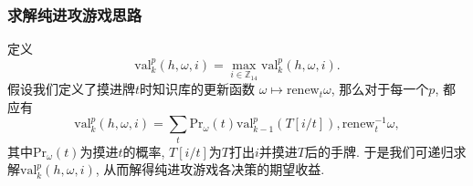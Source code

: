 \documentclass{ctexbeamer}
\newcommand{\hand}{h}
\newcommand{\base}{\omega}
\newcommand{\prob}{\mathrm{Pr}}
\begin{document}
	\begin{frame}
		\frametitle{求解纯进攻游戏思路}
		定义
		\[\mathrm{val}_{k}^{p}(\hand, \base, i)=
		\max_{i\in\mathbb{Z}_{14}}{\mathrm{val}_{k}^{p}(\hand, \base, i)}.\]
		假设我们定义了摸进牌$t$时知识库的更新函数
		$\base\mapsto\mathrm{renew}_t{\base}$,
		那么对于每一个$p$, 都应有
		\[\mathrm{val}_{k}^{p}(\hand, \base, i)=
		\sum_{t}{\prob_{\base}}(t)\mathrm{val}_{k-1}^{p}(T[i/t]),
		\mathrm{renew}_{t}^{-1}{\base},\]
		其中$\prob_{\base}(t)$为摸进$t$的概率, $T[i/t]$为$T$打出$i$并摸进$T$后的手牌.
		于是我们可递归求解$\mathrm{val}_{k}^{p}(\hand, \base, i)$,
		从而解得纯进攻游戏各决策的期望收益.
	\end{frame}
\end{document}
